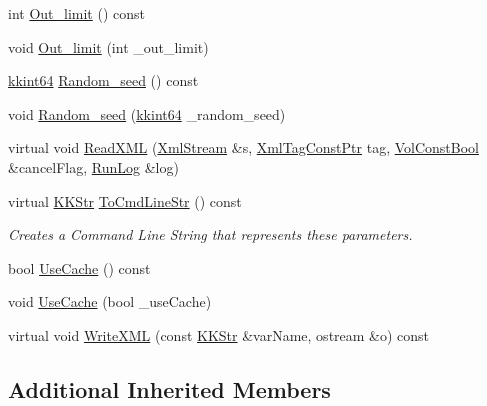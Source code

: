 \begin{DoxyCompactItemize}
\item 
int \hyperlink{class_k_k_m_l_l_1_1_model_param_usf_cas_cor_ad5c5f89c86e9a6cb54d9fbc7c53f4741}{Out\+\_\+limit} () const 
\item 
void \hyperlink{class_k_k_m_l_l_1_1_model_param_usf_cas_cor_a87a5fd8c5418c9690145b12e7525f060}{Out\+\_\+limit} (int \+\_\+out\+\_\+limit)
\item 
\hyperlink{namespace_k_k_b_aa3486b1c5ea9162b3b020c69f72826eb}{kkint64} \hyperlink{class_k_k_m_l_l_1_1_model_param_usf_cas_cor_af7c7da0c942cbd9c9424cf15e665e3a4}{Random\+\_\+seed} () const 
\item 
void \hyperlink{class_k_k_m_l_l_1_1_model_param_usf_cas_cor_a2d59141e4045802069a5e6bfee53fd1d}{Random\+\_\+seed} (\hyperlink{namespace_k_k_b_aa3486b1c5ea9162b3b020c69f72826eb}{kkint64} \+\_\+random\+\_\+seed)
\item 
virtual void \hyperlink{class_k_k_m_l_l_1_1_model_param_usf_cas_cor_a9ddbb18c33723f069b21165a13a400c5}{Read\+X\+ML} (\hyperlink{class_k_k_b_1_1_xml_stream}{Xml\+Stream} \&s, \hyperlink{namespace_k_k_b_a5f1b0b1667d79fec26deeff10c43df23}{Xml\+Tag\+Const\+Ptr} tag, \hyperlink{namespace_k_k_b_a7d390f568e2831fb76b86b56c87bf92f}{Vol\+Const\+Bool} \&cancel\+Flag, \hyperlink{class_k_k_b_1_1_run_log}{Run\+Log} \&log)
\item 
virtual \hyperlink{class_k_k_b_1_1_k_k_str}{K\+K\+Str} \hyperlink{class_k_k_m_l_l_1_1_model_param_usf_cas_cor_a671765bcd445cea02abb5eae152d7e99}{To\+Cmd\+Line\+Str} () const 
\begin{DoxyCompactList}\small\item\em Creates a Command Line String that represents these parameters. \end{DoxyCompactList}\item 
bool \hyperlink{class_k_k_m_l_l_1_1_model_param_usf_cas_cor_a02bb09029672c06c62aa65c400df710e}{Use\+Cache} () const 
\item 
void \hyperlink{class_k_k_m_l_l_1_1_model_param_usf_cas_cor_a1202cc25afbe0652f47b3ed0a4139756}{Use\+Cache} (bool \+\_\+use\+Cache)
\item 
virtual void \hyperlink{class_k_k_m_l_l_1_1_model_param_usf_cas_cor_a0f2da3ff567781256a5b034c52dac7da}{Write\+X\+ML} (const \hyperlink{class_k_k_b_1_1_k_k_str}{K\+K\+Str} \&var\+Name, ostream \&o) const 
\end{DoxyCompactItemize}
\subsection*{Additional Inherited Members}


